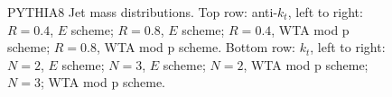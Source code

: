 \begin{figure}[H]
\hfill
{}\hfill
{}\hfill
\caption{PYTHIA8 Jet mass distributions. Top row: anti-$k_t$, left to right: $R=0.4$, $E$ scheme; $R=0.8$, $E$ scheme; $R=0.4$, WTA mod p scheme; $R=0.8$, WTA mod p scheme. Bottom row: $k_t$, left to right: $N=2$, $E$ scheme; $N=3$, $E$ scheme; $N=2$, WTA mod p scheme; $N=3$; WTA mod p scheme.}  
\end{figure}


